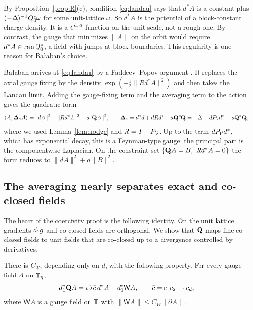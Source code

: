 By Proposition~\ref{prop:R}(c), condition \eqref{eq:landau} says that $d^*A$ is a constant plus $(-\Delta)^{-1}Q_0^*\omega$ for some unit-lattice $\omega$. So $d^*A$ is the potential of a block-constant charge density. It is a $C^{1,\alpha}$ function on the unit scale, not a rough one. By contrast, the gauge that minimizes $\|A\|$ on the orbit would require $d^*A\in\operatorname{ran} Q_0^*$, a field with jumps at block boundaries. This regularity is one reason for Ba\l aban's choice.

\begin{remark}
Ba\l aban arrives at \eqref{eq:landau} by a Faddeev--Popov argument \cite[(1.21)--(1.39)]{BalPropI}. It replaces the axial gauge fixing by the density $\exp(-\frac12\|Rd^*A\|^2)$ and then takes the Landau limit. Adding the gauge-fixing term and the averaging term to the action gives the quadratic form
\[
\langle A,\boldsymbol{\Delta}_aA\rangle=\|dA\|^2+\|Rd^*A\|^2+a\|\mathbf Q A\|^2,\qquad
\boldsymbol{\Delta}_a=d^*d+dRd^*+a\mathbf Q^*\mathbf Q=-\Delta-dP_\mathcal V d^*+a\mathbf Q^*\mathbf Q ,
\]
where we used Lemma~\ref{lem:hodge} and $R=I-P_\mathcal V$. Up to the term $dP_\mathcal V d^*$, which has exponential decay, this is a Feynman-type gauge: the principal part is the componentwise Laplacian. On the constraint set $\{\bQ A=B,\ Rd^*A=0\}$ the form reduces to $\|dA\|^2+a\|B\|^2$.
\end{remark}

\subsection{The averaging nearly separates exact and co-closed fields}

The heart of the coercivity proof is the following identity. On the unit lattice, gradients $d_1 g$ and co-closed fields are orthogonal. We show that $\mathbf Q$ maps fine co-closed fields to unit fields that are co-closed up to a divergence controlled by derivatives.

\begin{lemma}\label{lem:Q-divergence}
There is $C_W$, depending only on $d$, with the following property. For every gauge field $A$ on $\mathbb T_\eta$,
\[
d_1^*\mathbf Q A=\iota\,b\,\bar c\,d^*A+d_1^*\mathsf WA,\qquad \bar c=c_1c_2\cdots c_d,
\]
where $\mathsf WA$ is a gauge field on $\mathbb T$ with $\|\mathsf WA\|\le C_W\|\partial A\|$.
\end{lemma}

